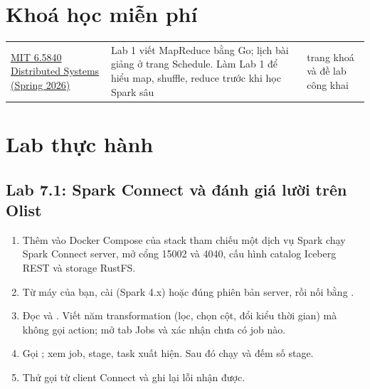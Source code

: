 \section{Khoá học miễn phí}
\begin{xltabular}{\textwidth}{@{}P{4.2cm} L P{2.6cm}@{}}
\toprule
{} &  &  \\
\midrule
\endhead
\bottomrule
\endfoot
\href{https://pdos.csail.mit.edu/6.824/}{MIT 6.5840 Distributed Systems (Spring 2026)} & Lab 1 viết MapReduce bằng Go; lịch bài giảng ở trang Schedule. Làm Lab 1 để hiểu map, shuffle, reduce trước khi học Spark sâu & trang khoá và đề lab công khai \\
\end{xltabular}

\section{Lab thực hành}

\subsection{Lab 7.1: Spark Connect và đánh giá lười trên Olist}
\begin{enumerate}
  \item Thêm vào Docker Compose của stack tham chiếu một dịch vụ Spark chạy Spark Connect server, mở cổng 15002 và 4040, cấu hình catalog Iceberg REST và storage RustFS.
  \item Từ máy của bạn, cài  (Spark 4.x) hoặc  đúng phiên bản server, rồi nối bằng .
  \item Đọc  và . Viết năm transformation (lọc, chọn cột, đổi kiểu thời gian) mà không gọi action; mở tab Jobs và xác nhận chưa có job nào.
  \item Gọi ; xem job, stage, task xuất hiện. Sau đó chạy  và đếm số stage.
  \item Thử gọi  từ client Connect và ghi lại lỗi nhận được.
\end{enumerate}

